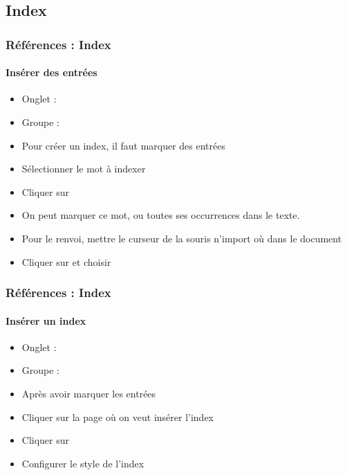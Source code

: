 \documentclass[xcolor=table]{beamer}
\begin{document}
\subsection{Index}

\begin{frame}[t]
\frametitle{Références : Index}
\framesubtitle{Insérer des entrées}

\begin{minipage}{0.69\textwidth}
\begin{itemize}
	\item Onglet : 
	\item Groupe : 
	\item Pour créer un index, il faut marquer des entrées 
	\item Sélectionner le mot à indexer 
	\item Cliquer sur 
	\item On peut marquer ce mot, ou toutes ses occurrences dans le texte.
	\item Pour le renvoi, mettre le curseur de la  souris n'import où dans le document 
	\item Cliquer sur  et choisir 
\end{itemize}
\end{minipage}
\begin{minipage}{0.30\textwidth}
\begin{flushright}
\end{flushright}
\vspace{-6pt}

\end{minipage}

\end{frame}

\begin{frame}[t]
\frametitle{Références : Index}
\framesubtitle{Insérer un index}

\begin{minipage}{0.61\textwidth}
\begin{itemize}
	\item Onglet : 
	\item Groupe : 
	\item Après avoir marquer les entrées
	\item Cliquer sur la page où on veut insérer l'index
	\item Cliquer sur 
	\item Configurer le style de l'index
\end{itemize}
\end{minipage}
\begin{minipage}{0.38\textwidth}
\begin{flushright}
\end{flushright}
\vspace{-6pt}

\end{minipage}

\end{frame}
\end{document}
